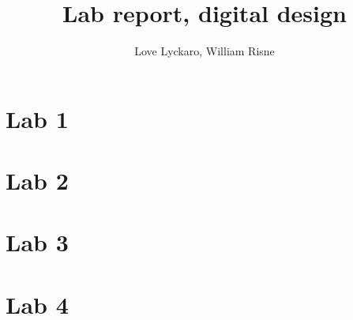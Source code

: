 \documentclass[a4paper]{article}
\title{Lab report, digital design}
\author{Love Lyckaro, William Risne}
\begin{document}
\maketitle

    \section*{Lab 1}

    \section*{Lab 2}

    \section*{Lab 3}

    \section*{Lab 4}
\end{document}
